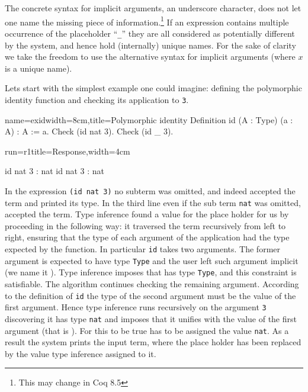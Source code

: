 The concrete syntax for implicit arguments, an underscore character,
does not let one name the missing piece of information.\footnote{This
may change in Coq 8.5}  If an expression contains multiple occurrence
of the placeholder ``\lstinline/_/'' they are all considered as
potentially different by the system, and hence hold (internally)
unique names.  For the sake of clarity we take the freedom to
use the alternative syntax  for implicit arguments (where
$x$ is a unique name).


Lets start with the simplest example one could imagine: defining the
polymorphic identity function and checking its application to
\lstinline/3/.

\begin{coq}{name=exid}{width=8cm,title=Polymorphic identity}
Definition id (A : Type) (a : A) : A := a.
Check (id nat 3).
Check (id _ 3).
\end{coq}
\begin{coqout}{run=r1}{title=Response,width=4cm}

id nat 3 : nat
id nat 3 : nat
\end{coqout}

In the expression \lstinline/(id nat 3)/ no subterm was omitted, and
indeed \Coq{} accepted the term and printed its type.  In the third
line even if the sub term \lstinline/nat/ was omitted, \Coq{} accepted
the term.  Type inference found a value for the place holder
for us by proceeding in the following way:  it traversed the term
recursively from left to right, ensuring that the type of each
argument of the application had the type expected by the function.  In
particular \lstinline/id/ takes two arguments.
The former argument is expected to have type \lstinline/Type/ and the
user left such argument implicit (we name it ).   Type
inference imposes that  has type \lstinline/Type/, and this
constraint is satisfiable.  The algorithm continues checking the
remaining argument.  According to the definition of \lstinline/id/ the type of
the second argument must be the value of the first argument.  Hence
type inference runs recursively on the argument \lstinline/3/
discovering it has type \lstinline/nat/ and imposes that it unifies
with the value of the first argument (that is ).  For this
to be true  has to be assigned the value \lstinline/nat/.
As a result the system prints the input term, where the place holder
has been replaced by the value type inference assigned to it.

